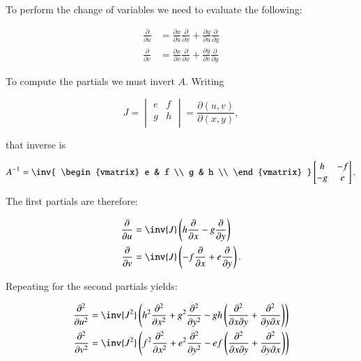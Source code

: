 To perform the change of variables we need to evaluate the following:

\begin{align}
\frac{\partial}{\partial u}
&= \frac{\partial x}{\partial u} \frac{\partial}{\partial x} + \frac{\partial y}{\partial u} \frac{\partial}{\partial y} \\
\frac{\partial}{\partial v}
&= \frac{\partial x}{\partial v} \frac{\partial}{\partial x} + \frac{\partial y}{\partial v} \frac{\partial}{\partial y}
\end{align}

To compute the partials we must invert $A$.  Writing

\[
J =
\begin{vmatrix}
e & f \\
g & h \\
\end{vmatrix}
=
\frac{\partial(u,v)}{\partial(x,y)},
\]

that inverse is

\[
A^{-1} =
\inv
{
\begin{vmatrix}
e & f \\
g & h \\
\end{vmatrix}
}
\begin{bmatrix}
h & -f \\
-g & e \\
\end{bmatrix}.
\]

The first partials are therefore:

\begin{align}
\frac{\partial}{\partial u}
&= \inv{J} \left(h \frac{\partial}{\partial x} - g \frac{\partial}{\partial y}\right) \\
\frac{\partial}{\partial v}
&= \inv{J} \left(-f \frac{\partial}{\partial x} + e \frac{\partial}{\partial y}\right).
\end{align}

Repeating for the second partials yields:

\begin{align}
\frac{\partial^2}{\partial u^2}
&= \inv{J^2} \left(
h^2 \frac{\partial^2}{\partial x^2} + g^2 \frac{\partial^2}{\partial y^2}
-g h \left( \frac{\partial^2}{\partial x \partial y} + \frac{\partial^2}{\partial y \partial x} \right)
\right) \\
\frac{\partial^2}{\partial v^2}
&= \inv{J^2} \left(
f^2 \frac{\partial^2}{\partial x^2} + e^2 \frac{\partial^2}{\partial y^2}
-e f \left( \frac{\partial^2}{\partial x \partial y} + \frac{\partial^2}{\partial y \partial x} \right)
\right)
\end{align}


